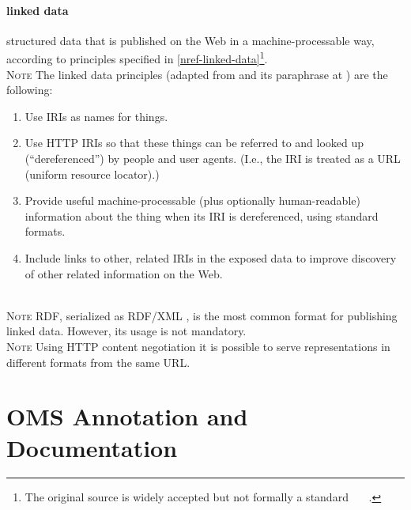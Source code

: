\documentclass[10pt,fleqn,final]{scrreprt}
\newcommand{\noterefname}{note}
\newcommand{\nref}[1]{\noterefname~\ref{#1}}
\newcommand{\sclause}[1]{\section{#1}}
\newcommand{\termdefinition}[2]{\index{#1}\paragraph{#1} #2}
\renewcommand{\nref}[1]{\ref{nref-#1}} %
\newenvironment{definitions}[0]{\medskip }{}
\newenvironment{note}[0]{\ \\ \textsc{Note} \quad}{}
\providecommand{\DIFadd}[1]{{\protect\color{blue}\uwave{#1}}} %
\providecommand{\DIFaddbegin}{} %
\providecommand{\DIFaddend}{} %
\providecommand{\DIFdelbegin}{} %
\providecommand{\DIFdelend}{} %
\begin{document}
\begin{definitions}
\DIFdelbegin %
\DIFdelend \DIFaddbegin \termdefinition{linked data}{structured data that is published on the Web in a machine-processable way, according to principles specified in \nref{linked-data}\footnote{The original source is widely accepted but not formally a standard~\mbox{%
\cite{BernersLee:LinkedData2006}
}%
.}.}
  \DIFaddend \begin{note}
    The linked data principles (adapted from \DIFdelbegin %
\DIFdelend \DIFaddbegin \DIFadd{\nref{linked-data} }\DIFaddend and its paraphrase at \cite{Wikipedia:LinkedData2011}) are the following:
    \begin{enumerate}
    \item Use IRIs as names for things.
    \item Use HTTP IRIs so that these things can be referred to and looked up (``dereferenced'') 
    by people and user agents. (I.e., the IRI is treated as a URL (uniform resource locator).)
    \item Provide useful machine-processable (plus optionally human-readable) information about the thing when its IRI is dereferenced, using standard formats.
    \item Include links to other, related IRIs in the exposed data to improve discovery of other related information on the Web.
    \end{enumerate}
  \end{note}

  \begin{note}
    RDF, serialized as RDF/XML \cite{W3C:REC-rdf-syntax-grammar-20140225}, is the most common format for publishing linked data.  However, its usage is not mandatory.
  \end{note}
  \begin{note}
    Using HTTP content negotiation \cite{rfc2616} it is possible to serve representations in different formats from the same URL. 
  \end{note}
\end{definitions}

\sclause{OMS Annotation and Documentation}\label{c:terms-annotation}
\end{document}
